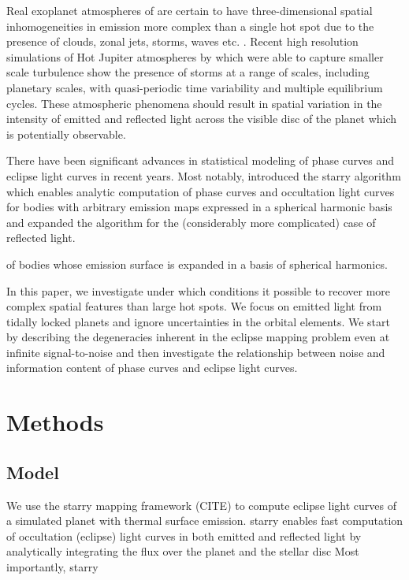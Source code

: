 \documentclass[modern]{aastex631}
\begin{document}
Real exoplanet atmospheres of are certain to have three-dimensional spatial 
inhomogeneities in emission more complex than a single hot spot due to the presence of clouds, zonal 
jets, storms, waves etc. \citep{showman2020}.
Recent high resolution simulations of Hot Jupiter atmospheres by \cite{cho2021} which were able 
to capture smaller scale turbulence show the presence of storms at a range of scales, including 
planetary scales, with quasi-periodic time variability and multiple equilibrium cycles.
These atmospheric phenomena should result in spatial variation in the intensity of emitted 
and reflected light across the visible disc of the planet which is potentially observable.

There have been significant advances in statistical modeling of phase curves and eclipse light
curves in recent years.
Most notably, \cite{luger2019a} introduced the \textsf{starry} algorithm which enables analytic
computation of phase curves and occultation light curves for bodies with arbitrary emission maps 
expressed in a spherical harmonic basis and\cite{luger2021d} expanded the algorithm for the (considerably more complicated) case of 
reflected light.

of bodies whose emission surface is 
expanded in a basis of spherical harmonics. 


In this paper, we investigate under which conditions it possible to recover more complex 
spatial features than large hot spots. 
We focus on emitted light from tidally locked planets and ignore uncertainties in the 
orbital elements.  
We start by describing the degeneracies inherent in the eclipse mapping problem even at 
infinite signal-to-noise and then investigate the relationship between noise and information 
content of phase curves and eclipse light curves. 


\section{Methods}
\label{sec:methods}

\subsection{Model}
\label{ssec:model}
We use the \textsf{starry} mapping framework (CITE) to compute eclipse light curves of a simulated planet with thermal surface emission.
\textsf{starry} enables fast computation of occultation (eclipse) light curves in both emitted and reflected light by analytically integrating the flux over the planet and the stellar disc 
Most importantly, \textsf{starry} 
\end{document}
